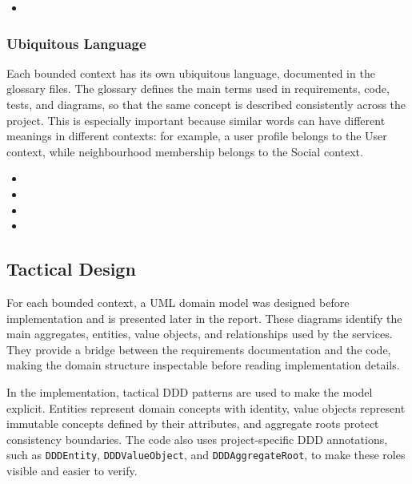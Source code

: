 \documentclass[12pt,a4paper]{article}
\begin{document}
\begin{itemize}
    \item {}
\end{itemize}

\subsubsection{Ubiquitous Language}

Each bounded context has its own ubiquitous language, documented in the glossary files. The glossary defines the main terms used in requirements, code, tests, and diagrams, so that the same concept is described consistently across the project. This is especially important because similar words can have different meanings in different contexts: for example, a user profile belongs to the User context, while neighbourhood membership belongs to the Social context.

\begin{itemize}
    \item {}
    \item {}
    \item {}
    \item {}
\end{itemize}

\subsection{Tactical Design}

For each bounded context, a UML domain model was designed before implementation and is presented later in the report. These diagrams identify the main aggregates, entities, value objects, and relationships used by the services. They provide a bridge between the requirements documentation and the code, making the domain structure inspectable before reading implementation details.

In the implementation, tactical DDD patterns are used to make the model explicit. Entities represent domain concepts with identity, value objects represent immutable concepts defined by their attributes, and aggregate roots protect consistency boundaries. The code also uses project-specific DDD annotations, such as \texttt{DDDEntity}, \texttt{DDDValueObject}, and \texttt{DDDAggregateRoot}, to make these roles visible and easier to verify.
\end{document}
